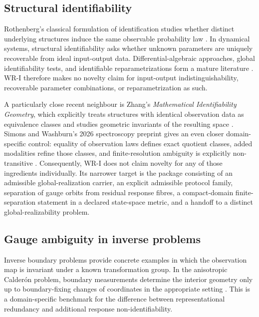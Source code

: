 \documentclass[11pt]{article}
\begin{document}
\subsection{Structural identifiability}

Rothenberg's classical formulation of identification studies whether distinct
underlying structures induce the same observable probability law
\cite{Rothenberg1971}. In dynamical systems, structural identifiability asks
whether unknown parameters are uniquely recoverable from ideal input-output
data. Differential-algebraic approaches, global identifiability tests, and
identifiable reparametrizations form a mature literature
\cite{Saccomani2003,Bellu2007,Villaverde2016,MeshkatSullivant2014}.
WR-I therefore makes no novelty claim for input-output indistinguishability,
recoverable parameter combinations, or reparametrization as such.

A particularly close recent neighbour is Zhang's \emph{Mathematical
Identifiability Geometry}, which explicitly treats structures with identical
observation data as equivalence classes and studies geometric invariants of the
resulting space \cite{Zhang2026}. Simons and Washburn's 2026 spectroscopy
preprint gives an even closer domain-specific control: equality of observation
laws defines exact quotient classes, added modalities refine those classes,
and finite-resolution ambiguity is explicitly non-transitive
\cite{SimonsWashburn2026}. Consequently, WR-I does not claim novelty for any
of those ingredients individually. Its narrower target is the package
consisting of an admissible global-realization carrier, an explicit admissible
protocol family, separation of gauge orbits from residual response fibres, a
compact-domain finite-separation statement in a declared state-space metric,
and a handoff to a distinct global-realizability problem.

\subsection{Gauge ambiguity in inverse problems}

Inverse boundary problems provide concrete examples in which the observation
map is invariant under a known transformation group. In the anisotropic
Calder\'on problem, boundary measurements determine the interior geometry only
up to boundary-fixing changes of coordinates in the appropriate setting
\cite{LassasLiimatainenSalo2020}. This is a domain-specific benchmark for the
difference between representational redundancy and additional response
non-identifiability.
\end{document}
